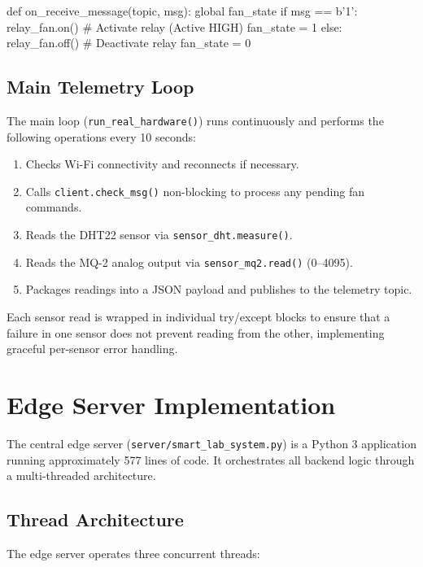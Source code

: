 \documentclass[12pt,a4paper]{report}
\begin{document}
\begin{codebox}[Python]
def on_receive_message(topic, msg):
    global fan_state
    if msg == b'1':
        relay_fan.on()    # Activate relay (Active HIGH)
        fan_state = 1
    else:
        relay_fan.off()   # Deactivate relay
        fan_state = 0
\end{codebox}

\subsection{Main Telemetry Loop}
The main loop (\texttt{run\_real\_hardware()}) runs continuously and performs the following operations every 10 seconds:
\begin{enumerate}
    \item Checks Wi-Fi connectivity and reconnects if necessary.
    \item Calls \texttt{client.check\_msg()} non-blocking to process any pending fan commands.
    \item Reads the DHT22 sensor via \texttt{sensor\_dht.measure()}.
    \item Reads the MQ-2 analog output via \texttt{sensor\_mq2.read()} (0--4095).
    \item Packages readings into a JSON payload and publishes to the telemetry topic.
\end{enumerate}

Each sensor read is wrapped in individual try/except blocks to ensure that a failure in one sensor does not prevent reading from the other, implementing graceful per-sensor error handling.

\section{Edge Server Implementation}
The central edge server (\texttt{server/smart\_lab\_system.py}) is a Python 3 application running approximately 577 lines of code. It orchestrates all backend logic through a multi-threaded architecture.

\subsection{Thread Architecture}
The edge server operates three concurrent threads:
\end{document}
